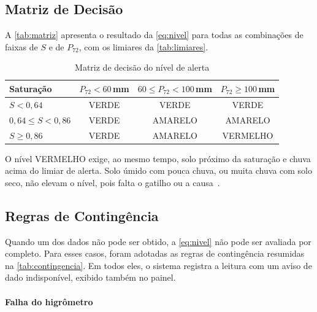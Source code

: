 \subsection{Matriz de Decisão}
\label{subsec:matriz-decisao}

A \autoref{tab:matriz} apresenta o resultado da \autoref{eq:nivel}
para todas as combinações de faixas de $S$ e de $P_{72}$, com os
limiares da \autoref{tab:limiares}.

\begin{table}[H]
\centering
\caption{Matriz de decisão do nível de alerta}
\label{tab:matriz}
\begin{tabular}{lccc}
\hline
\textbf{Saturação} & \textbf{$P_{72} < 60$\,mm} & \textbf{$60 \leq P_{72} < 100$\,mm} & \textbf{$P_{72} \geq 100$\,mm} \\
\hline
$S < 0{,}64$             & VERDE & VERDE   & VERDE    \\
$0{,}64 \leq S < 0{,}86$ & VERDE & AMARELO & AMARELO  \\
$S \geq 0{,}86$          & VERDE & AMARELO & VERMELHO \\
\hline
\end{tabular}
\end{table}

O nível VERMELHO exige, ao mesmo tempo, solo próximo da saturação e
chuva acima do limiar de alerta. Solo úmido com pouca chuva, ou muita
chuva com solo seco, não elevam o nível, pois falta o gatilho ou a
causa~\cite{bogaard2018hydrological}.

\subsection{Regras de Contingência}
\label{subsec:contingencia}

Quando um dos dados não pode ser obtido, a \autoref{eq:nivel} não pode
ser avaliada por completo. Para esses casos, foram adotadas as regras
de contingência resumidas na \autoref{tab:contingencia}. Em todos
eles, o sistema registra a leitura com um aviso de dado indisponível,
exibido também no painel.

\paragraph*{Falha do higrômetro}

